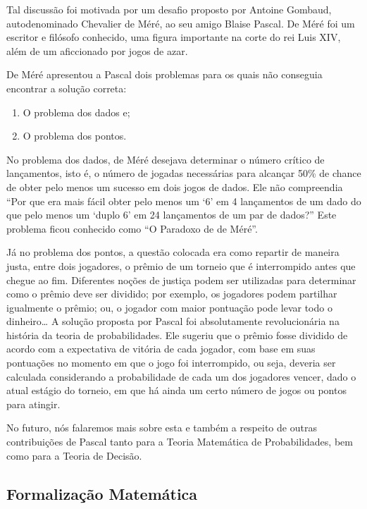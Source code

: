 \documentclass[
]{book}
\providecommand{\tightlist}{%
  \setlength{\itemsep}{0pt}\setlength{\parskip}{0pt}}
\theoremstyle{definition}
\theoremstyle{definition}
\theoremstyle{definition}
\theoremstyle{remark}
\begin{document}
Tal discussão foi motivada por um desafio proposto por Antoine Gombaud, autodenominado Chevalier de Méré, ao seu amigo Blaise Pascal. De Méré foi um escritor e filósofo conhecido, uma figura importante na corte do rei Luis XIV, além de um aficcionado por jogos de azar.

De Méré apresentou a Pascal dois problemas para os quais não conseguia encontrar a solução correta:

\begin{enumerate}
\def\labelenumi{(\arabic{enumi})}
\tightlist
\item
  O problema dos dados e;\\
\item
  O problema dos pontos.
\end{enumerate}

No problema dos dados, de Méré desejava determinar o número crítico de lançamentos, isto é, o número de jogadas necessárias para alcançar 50\% de chance de obter pelo menos um sucesso em dois jogos de dados. Ele não compreendia ``Por que era mais fácil obter pelo menos um `6' em 4 lançamentos de um dado do que pelo menos um `duplo 6' em 24 lançamentos de um par de dados?'' Este problema ficou conhecido como ``O Paradoxo de de Méré''.

Já no problema dos pontos, a questão colocada era como repartir de maneira justa, entre dois jogadores, o prêmio de um torneio que é interrompido antes que chegue ao fim. Diferentes noções de justiça podem ser utilizadas para determinar como o prêmio deve ser dividido; por exemplo, os jogadores podem partilhar igualmente o prêmio; ou, o jogador com maior pontuação pode levar todo o dinheiro\ldots{} A solução proposta por Pascal foi absolutamente revolucionária na história da teoria de probabilidades. Ele sugeriu que o prêmio fosse dividido de acordo com a expectativa de vitória de cada jogador, com base em suas pontuações no momento em que o jogo foi interrompido, ou seja, deveria ser calculada considerando a probabilidade de cada um dos jogadores vencer, dado o atual estágio do torneio, em que há ainda um certo número de jogos ou pontos para atingir.

No futuro, nós falaremos mais sobre esta e também a respeito de outras contribuições de Pascal tanto para a Teoria Matemática de Probabilidades, bem como para a Teoria de Decisão.

\hypertarget{formalizauxe7uxe3o-matemuxe1tica}{%
\subsection*{Formalização Matemática}\label{formalizauxe7uxe3o-matemuxe1tica}}
\end{document}
